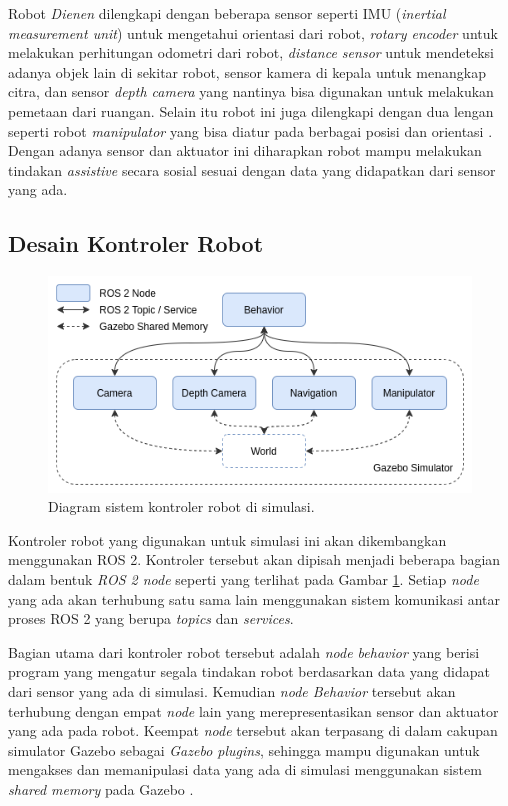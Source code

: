 Robot \emph{Dienen} dilengkapi dengan beberapa sensor seperti IMU (\emph{inertial measurement unit}) untuk mengetahui orientasi dari robot, \emph{rotary encoder} untuk melakukan perhitungan odometri dari robot, \emph{distance sensor} untuk mendeteksi adanya objek lain di sekitar robot, sensor kamera di kepala untuk menangkap citra, dan sensor \emph{depth camera} yang nantinya bisa digunakan untuk melakukan pemetaan dari ruangan.
Selain itu robot ini juga dilengkapi dengan dua lengan seperti robot \emph{manipulator} yang bisa diatur pada berbagai posisi dan orientasi \citep{iqbal2012}.
Dengan adanya sensor dan aktuator ini diharapkan robot mampu melakukan tindakan \emph{assistive} secara sosial sesuai dengan data yang didapatkan dari sensor yang ada.

\subsection{Desain Kontroler Robot}

\begin{figure} [ht]
  \centering
  \includegraphics[scale=0.45]{gambar/kontrolersimulasi.png}
  \caption{Diagram sistem kontroler robot di simulasi.}
  \label{fig:kontrolersimulasi}
\end{figure}

Kontroler robot yang digunakan untuk simulasi ini akan dikembangkan menggunakan ROS 2.
Kontroler tersebut akan dipisah menjadi beberapa bagian dalam bentuk \emph{ROS 2 node} seperti yang terlihat pada Gambar \ref{fig:kontrolersimulasi}.
Setiap \emph{node} yang ada akan terhubung satu sama lain menggunakan sistem komunikasi antar proses ROS 2 yang berupa \emph{topics} dan \emph{services}.

Bagian utama dari kontroler robot tersebut adalah \emph{node behavior} yang berisi program yang mengatur segala tindakan robot berdasarkan data yang didapat dari sensor yang ada di simulasi.
Kemudian \emph{node Behavior} tersebut akan terhubung dengan empat \emph{node} lain yang merepresentasikan sensor dan aktuator yang ada pada robot.
Keempat \emph{node} tersebut akan terpasang di dalam cakupan simulator Gazebo sebagai \emph{Gazebo plugins}, sehingga mampu digunakan untuk mengakses dan memanipulasi data yang ada di simulasi menggunakan sistem \emph{shared memory} pada Gazebo \citep{gazeboplugins}.

